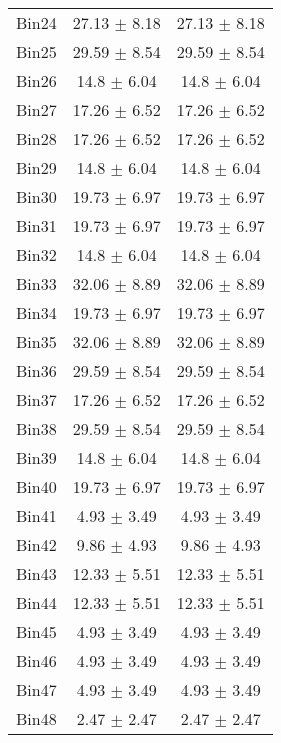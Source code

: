 \begin{tabular}{|c|c|c|}
     Bin24 & 27.13 $\pm$ 8.18 & 27.13 $\pm$ 8.18 \\ \cline{1-3} 
     Bin25 & 29.59 $\pm$ 8.54 & 29.59 $\pm$ 8.54 \\ \cline{1-3} 
     Bin26 & 14.8 $\pm$ 6.04 & 14.8 $\pm$ 6.04 \\ \cline{1-3} 
     Bin27 & 17.26 $\pm$ 6.52 & 17.26 $\pm$ 6.52 \\ \cline{1-3} 
     Bin28 & 17.26 $\pm$ 6.52 & 17.26 $\pm$ 6.52 \\ \cline{1-3} 
     Bin29 & 14.8 $\pm$ 6.04 & 14.8 $\pm$ 6.04 \\ \cline{1-3} 
     Bin30 & 19.73 $\pm$ 6.97 & 19.73 $\pm$ 6.97 \\ \cline{1-3} 
     Bin31 & 19.73 $\pm$ 6.97 & 19.73 $\pm$ 6.97 \\ \cline{1-3} 
     Bin32 & 14.8 $\pm$ 6.04 & 14.8 $\pm$ 6.04 \\ \cline{1-3} 
     Bin33 & 32.06 $\pm$ 8.89 & 32.06 $\pm$ 8.89 \\ \cline{1-3} 
     Bin34 & 19.73 $\pm$ 6.97 & 19.73 $\pm$ 6.97 \\ \cline{1-3} 
     Bin35 & 32.06 $\pm$ 8.89 & 32.06 $\pm$ 8.89 \\ \cline{1-3} 
     Bin36 & 29.59 $\pm$ 8.54 & 29.59 $\pm$ 8.54 \\ \cline{1-3} 
     Bin37 & 17.26 $\pm$ 6.52 & 17.26 $\pm$ 6.52 \\ \cline{1-3} 
     Bin38 & 29.59 $\pm$ 8.54 & 29.59 $\pm$ 8.54 \\ \cline{1-3} 
     Bin39 & 14.8 $\pm$ 6.04 & 14.8 $\pm$ 6.04 \\ \cline{1-3} 
     Bin40 & 19.73 $\pm$ 6.97 & 19.73 $\pm$ 6.97 \\ \cline{1-3} 
     Bin41 & 4.93 $\pm$ 3.49 & 4.93 $\pm$ 3.49 \\ \cline{1-3} 
     Bin42 & 9.86 $\pm$ 4.93 & 9.86 $\pm$ 4.93 \\ \cline{1-3} 
     Bin43 & 12.33 $\pm$ 5.51 & 12.33 $\pm$ 5.51 \\ \cline{1-3} 
     Bin44 & 12.33 $\pm$ 5.51 & 12.33 $\pm$ 5.51 \\ \cline{1-3} 
     Bin45 & 4.93 $\pm$ 3.49 & 4.93 $\pm$ 3.49 \\ \cline{1-3} 
     Bin46 & 4.93 $\pm$ 3.49 & 4.93 $\pm$ 3.49 \\ \cline{1-3} 
     Bin47 & 4.93 $\pm$ 3.49 & 4.93 $\pm$ 3.49 \\ \cline{1-3} 
     Bin48 & 2.47 $\pm$ 2.47 & 2.47 $\pm$ 2.47 \\ \cline{1-3} 

\end{tabular}

